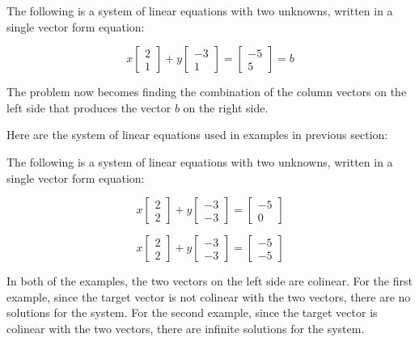 \documentclass[a4paper,12pt]{article}
\begin{document}
\begin{exm}
  The following is a system of linear equations with two unknowns, written in a single vector form equation:

  $$x\begin{bmatrix}
    2\\
    1
  \end{bmatrix}+y\begin{bmatrix}
    -3\\
    1
  \end{bmatrix}=\begin{bmatrix}
    -5\\
    5
  \end{bmatrix}=b$$\s

  The problem now becomes finding the combination of the column vectors on the left side that produces the vector $b$ on the right side.
\end{exm}\n

Here are the system of linear equations used in examples in previous section:\n

\begin{exm}
  The following is a system of linear equations with two unknowns, written in a single vector form equation:

  $$x\begin{bmatrix}
    2\\
    2
  \end{bmatrix}+y\begin{bmatrix}
    -3\\
    -3
  \end{bmatrix}=\begin{bmatrix}
    -5\\
    0
  \end{bmatrix}$$\s

  $$x\begin{bmatrix}
    2\\
    2
  \end{bmatrix}+y\begin{bmatrix}
    -3\\
    -3
  \end{bmatrix}=\begin{bmatrix}
    -5\\
    -5
  \end{bmatrix}$$\s

  In both of the examples, the two vectors on the left side are colinear. For the first example, since the target vector is not colinear with the two vectors, there are no solutions for the system. For the second example, since the target vector is colinear with the two vectors, there are infinite solutions for the system.
\end{exm}\n
\end{document}
